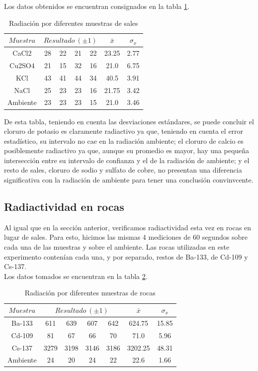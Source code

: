 \documentclass[%
 reprint,
 amsmath,amssymb,
 aps,
]{revtex4-1}
\begin{document}
Los datos obtenidos se encuentran consignados en la tabla \ref{table:sales}.\\

\begin{table}[h!]
\centering
\begin{tabular}{|c|c|c|c|c|c|c|}
	\hline $ Muestra $ & \multicolumn{4}{c|}{$Resultado\ (\pm 1)$ } & $\bar{x}$& $\sigma_x$ \\ 
	\hline\hline
	CaCl2&28&22&21&22&23.25&2.77\\
	Cu2SO4&21&15&32&16&21.0&6.75\\
	KCl&43&41&44&34&40.5&3.91\\
	NaCl&25&23&23&16&21.75&3.42\\
	Ambiente&23&23&23&15&21.0&3.46\\
	[1ex] 
 \hline
 \end{tabular} 
  \caption{Radiación por diferentes muestras de sales}
\label{table:sales} 
\end{table}

De esta tabla, teniendo en cuenta las desviaciones estándares, se puede concluir el cloruro de potasio es claramente radiactivo ya que, teniendo en cuenta el error estadístico, su intervalo no cae en la radiación ambiente; el cloruro de calcio es posiblemente radiactivo ya que, aunque su promedio es mayor, hay una pequeña intersección entre su intervalo de confianza y el de la radiación de ambiente; y el resto de sales, cloruro de sodio y sulfato de cobre, no presentan una diferencia significativa con la radiación de ambiente para tener una conclusión convinvcente.\\

\subsection{\label{sec:level2}Radiactividad en rocas} 
Al igual que en la sección anterior, verificamos radiactividad esta vez en rocas en lugar de sales. Para esto, hicimos las mismas 4 mediciones de 60 segundos sobre cada una de las muestras y sobre el ambiente. Las rocas utilizadas en este experimento contenían cada una, y por separado, restos de Ba-133, de Cd-109 y Cs-137.\\

Los datos tomados se encuentran en la tabla \ref{table:rocas}.\\

\begin{table}[h!]
\centering
\begin{tabular}{|c|c|c|c|c|c|c|}
	\hline $ Muestra $ & \multicolumn{4}{c|}{$Resultado\ (\pm 1)$ } & $\bar{x}$& $\sigma_x$ \\ 
	\hline\hline
	Ba-133&611&639&607&642&624.75&15.85\\
	Cd-109&81&67&66&70&71.0&5.96\\
	Cs-137&3279&3198&3146&3186&3202.25&48.31\\
	Ambiente&24&20&24&22&22.6&1.66\\
	[1ex] 
 \hline
 \end{tabular} 
  \caption{Radiación por diferentes muestras de rocas}
\label{table:rocas} 
\end{table}
\end{document}

